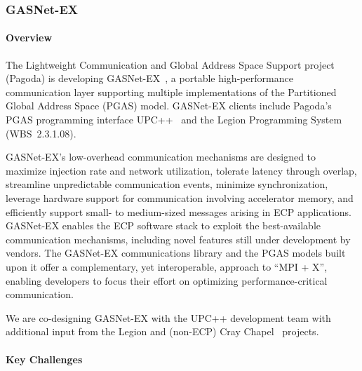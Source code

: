 \subsubsection{ GASNet-EX}\label{subsubsect:gasnet-ex}
\paragraph{Overview} 

The Lightweight Communication and Global Address Space Support project (Pagoda)
is developing GASNet-EX~\cite{gasnet-site}, a portable high-performance communication layer
supporting multiple implementations of the Partitioned Global Address Space
(PGAS) model.
GASNet-EX clients include Pagoda's PGAS programming interface UPC++~\cite{Bachan:paw17,upcxx-site}
 and the Legion Programming
System~\cite{bauer2012legion,legion-site} (WBS~2.3.1.08).

GASNet-EX's low-overhead communication mechanisms are designed to maximize
injection rate and network utilization, tolerate latency through
overlap, streamline unpredictable communication events, minimize
synchronization,
leverage hardware support for communication involving accelerator memory,
and efficiently support small- to medium-sized
messages arising in ECP applications.  GASNet-EX enables the ECP
software stack to exploit the best-available communication mechanisms,
including novel features still under development by vendors.  The
GASNet-EX communications library and the PGAS models built upon it
offer a complementary, yet interoperable, approach to ``MPI + X'',
enabling developers to focus their effort on optimizing
performance-critical communication.

We are co-designing GASNet-EX with the UPC++ development team with
additional input from the Legion and
(non-ECP) Cray Chapel~\cite{chapel-chapter,chapel-site} projects.

\paragraph{Key  Challenges}

